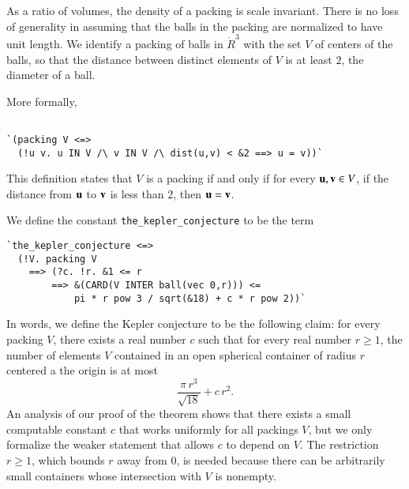 As a ratio of volumes, the density of a packing is scale invariant.   There is no loss of generality in assuming that
the balls in the packing are normalized
to have unit length.
We identify a packing of balls in $\ring{R}^3$ with the set $V$ of centers of the balls,
so that the distance between distinct elements of $V$ is at least $2$, the diameter of a ball.

More formally,

\begin{obeylines}

\begin{verbatim}

`(packing V <=> 
  (!u v. u IN V /\ v IN V /\ dist(u,v) < &2 ==> u = v))`

\end{verbatim}
\end{obeylines}
This definition states that $V$ is a packing if and only if for every ${\mathbf u}, {\mathbf v} \in V$, if
the distance from ${\mathbf u}$ to ${\mathbf v}$ is less than $2$, then ${\mathbf u}={\mathbf v}$.

We define the constant {\tt the\_kepler\_conjecture} to be the term

\begin{obeylines}

\begin{verbatim}
`the_kepler_conjecture <=>
  (!V. packing V
    ==> (?c. !r. &1 <= r
        ==> &(CARD(V INTER ball(vec 0,r))) <=
            pi * r pow 3 / sqrt(&18) + c * r pow 2))`
\end{verbatim}
\end{obeylines}

In words, we define the Kepler conjecture to be the following claim:
for every packing $V$, there exists a real number $c$ such that for every real number $r\ge 1$, the number
of elements $V$ contained in an open spherical container of radius $r$ centered a the origin is at most
\[
  \frac{\pi\, r^3}{\sqrt{18}} + c\, r^2.
\]
An analysis of our proof of the theorem shows that there exists a small computable constant $c$ that works uniformly
for all packings $V$,
but we only formalize the weaker statement that allows $c$ to depend on $V$.
The restriction $r\ge 1$, which bounds $r$ away from $0$,
is needed because there can be arbitrarily small containers whose intersection with $V$ is nonempty.

